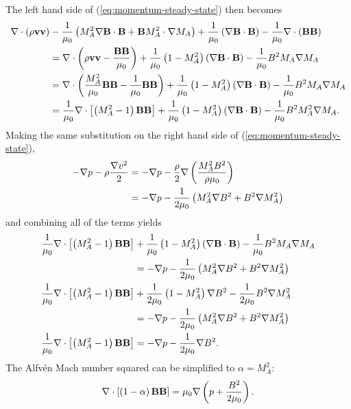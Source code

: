 The left hand side of (\ref{eq:momentum-steady-state}) then becomes
\[\begin{split}
    \nabla \cdot\left( \rho\mathbf{v}\mathbf{v} \right) &- \frac{1}{\mu_0}\left( M_A^2\nabla\mathbf{B}\cdot\mathbf{B} + \mathbf{B} M_A^2\cdot\nabla M_A \right) + \frac{1}{\mu_0}\left( \nabla\mathbf{B}\cdot\mathbf{B} \right) - \frac{1}{\mu_0}\nabla \cdot\left( \mathbf{B}\mathbf{B} \right) \\
    &= \nabla \cdot\left( \rho\mathbf{v}\mathbf{v} - \frac{\mathbf{B}\mathbf{B}}{\mu_0} \right) + \frac{1}{\mu_0}\left( 1-M_A^2 \right)\left( \nabla\mathbf{B}\cdot\mathbf{B} \right) - \frac{1}{\mu_0}B^2 M_A\nabla M_A \\
    &= \nabla \cdot\left( \frac{M_A^2}{\mu_0}\mathbf{B}\mathbf{B} - \frac{1}{\mu_0}\mathbf{B}\mathbf{B} \right) + \frac{1}{\mu_0}\left( 1-M_A^2 \right)\left( \nabla\mathbf{B}\cdot\mathbf{B} \right) - \frac{1}{\mu_0}B^2M_A\nabla M_A \\
    &= \frac{1}{\mu_0}\nabla \cdot\left[ \left( M_A^2-1 \right)\mathbf{B}\mathbf{B} \right] + \frac{1}{\mu_0}\left( 1-M_A^2 \right)\left( \nabla\mathbf{B}\cdot\mathbf{B} \right) - \frac{1}{\mu_0}B^2 M_A^2\nabla M_A. \\
\end{split}\]
Making the same substitution on the right hand side of (\ref{eq:momentum-steady-state}),
\[\begin{split}
    -\nabla p -\rho\frac{\nabla v^2}{2} &= -\nabla p -\frac{\rho}{2}\nabla\left( \frac{M_A^2 B^2}{\rho\mu_0} \right) \\
    &= -\nabla p - \frac{1}{2\mu_0}\left( M_A^2 \nabla B^2 + B^2\nabla M_A^2 \right) \\
\end{split}\]
and combining all of the terms yields
\[\begin{split}
    \frac{1}{\mu_0}\nabla \cdot\left[ \left( M_A^2-1 \right)\mathbf{B}\mathbf{B} \right] &+ \frac{1}{\mu_0}\left( 1-M_A^2 \right)\left( \nabla\mathbf{B}\cdot\mathbf{B} \right) - \frac{1}{\mu_0}B^2 M_A\nabla M_A \\
    &= -\nabla p - \frac{1}{2\mu_0}\left( M_A^2 \nabla B^2 + B^2\nabla M_A^2 \right) \\
    \frac{1}{\mu_0}\nabla \cdot\left[ \left( M_A^2-1 \right)\mathbf{B}\mathbf{B} \right] &+ \frac{1}{2\mu_0}\left( 1-M_A^2 \right)\nabla B^2 - \frac{1}{2\mu_0}B^2\nabla M_A^2 \\
    &= -\nabla p - \frac{1}{2\mu_0}\left( M_A^2 \nabla B^2 + B^2\nabla M_A^2 \right) \\
    \frac{1}{\mu_0}\nabla \cdot\left[ \left( M_A^2-1 \right)\mathbf{B}\mathbf{B} \right] &= - \nabla p -\frac{1}{2\mu_0}\nabla B^2. \\
\end{split}\]
The Alfv\'en Mach number squared can be simplified to $\alpha=M_A^2$:
\begin{equation}
    \nabla \cdot\left[ \left( 1-\alpha \right)\mathbf{B}\mathbf{B} \right] = \mu_0\nabla\left( p + \frac{B^2}{2\mu_0} \right).
    \label{eq:deldotBB}
\end{equation}
